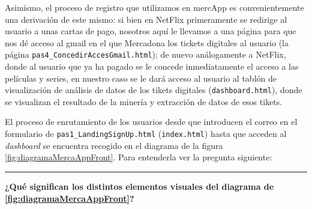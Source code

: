 \documentclass[a4paper,12pt]{report}
\begin{document}
	Asimismo, el proceso de registro que utilizamos en mercApp es convenientemente una derivación de este mismo: si bien en NetFlix primeramente se redirige al usuario a unas cartas de pago, nosotros aquí le llevamos a una página para que nos dé acceso al gmail en el que Mercadona los tickets digitales al usuario (la página  \texttt{pas4\_ConcedirAccesGmail.html}); de nuevo análogamente a NetFlix, donde al usuario que ya ha pagado se le concede inmediatamente el acceso a las películas y series,  en nuestro caso se le dará acceso al usuario al tablón de visualización de análisis de datos de los tikets digitales  (\texttt{dashboard.html}), donde se visualizan el resultado de la minería y extracción de datos de esos tikets. 
	
	El proceso de enrutamiento de los usuarios desde que introducen el correo en el formulario de \texttt{pas1\_LandingSignUp.html} (\texttt{index.html}) hasta que acceden al \textit{dashboard} se encuentra recogido en el diagrama de la figura \ref{fig:diagramaMercaAppFront}. Para entenderla ver la pregunta siguiente:
	\vspace{1em}
	\hrule
	\textbf{¿Qué significan los distintos elementos visuales del diagrama de \ref{fig:diagramaMercaAppFront}?}
\end{document}
